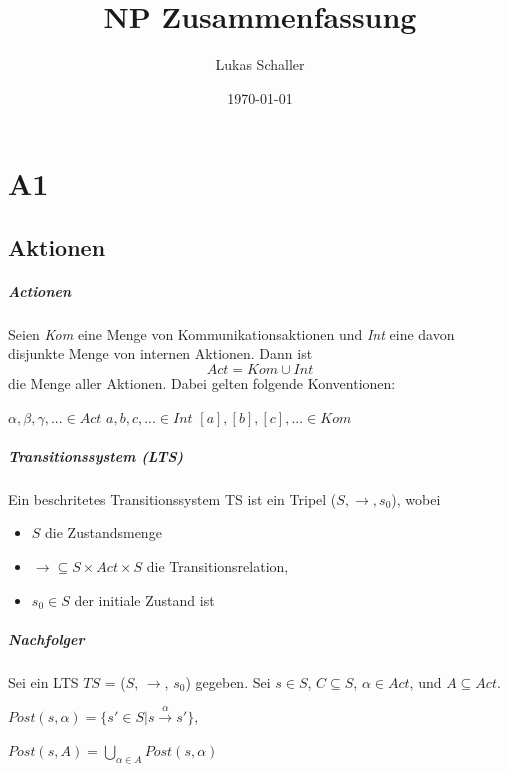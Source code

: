 \documentclass[a4paper,10pt, oneside]{book}
\title{NP Zusammenfassung}
\author{Lukas Schaller}
\date{\today}
\begin{document}
\maketitle
\tableofcontents

\chapter{A1}
\section{Aktionen}
\paragraph{Actionen}
Seien \textit{Kom} eine Menge von Kommunikationsaktionen und \textit{Int} eine davon disjunkte Menge von internen Aktionen. Dann ist
\begin{equation*}
 Act = Kom \cup Int
\end{equation*}
die Menge aller Aktionen. Dabei gelten folgende Konventionen:

$ \alpha, \beta, \gamma, ... \in Act$ \quad\quad
$ a,b,c,... \in Int$ \quad\quad
$ [a],[b],[c],... \in Kom$ \quad\quad

\paragraph{Transitionssystem (LTS)}
Ein beschritetes Transitionssystem TS ist ein Tripel ($S, \longrightarrow, s_0$), wobei
\begin{itemize}
 \item $S$ die Zustandsmenge
 \item $\longrightarrow \subseteq S \times Act \times S$ die Transitionsrelation,
 \item $s_0 \in S$ der initiale Zustand ist
\end{itemize}


\paragraph{Nachfolger}
Sei ein LTS $TS$ = ($S$, $\rightarrow$, $s_0$) gegeben. Sei $s \in S$, $C \subseteq S$, $ \alpha \in Act$, und $A \subseteq Act$.

\begin{flushleft}
 $Post(s,\alpha) = \{s' \in S | s \xrightarrow{\alpha} s'\}$, 
\end{flushleft}

\begin{flushright}
 $Post(s,A) = \bigcup\limits_{\alpha \in A} Post(s,\alpha)$
\end{flushright}
\end{document}
